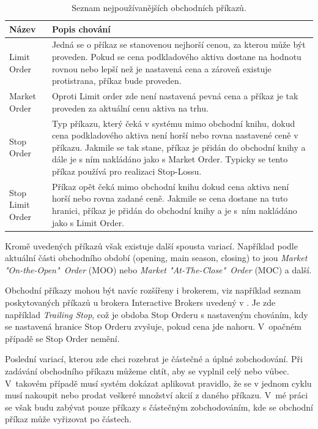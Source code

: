 \documentclass[thesis=M,czech]{FITthesis}[2012/06/26]
\begin{document}
\begin{table}[h]
 	\label{tab:orders}
	\begin{center}
		\def\arraystretch{1.5}%
		\begin{tabular}{|l|p{10cm}|}
		\hline
	    \textbf{Název} & \textbf{Popis chování} \\
	    \hline
	    Limit Order & Jedná se o příkaz se stanovenou nejhorší cenou, za kterou může být proveden. Pokud se cena podkladového aktiva dostane na hodnotu rovnou nebo lepší než je nastavená cena a zároveň existuje protistrana, příkaz bude proveden.
		\\ \hline
		Market Order & Oproti Limit order zde není nastavená pevná cena a příkaz je tak proveden za aktuální cenu aktiva na trhu.
		\\ \hline
	    Stop Order & Typ příkazu, který čeká v systému mimo obchodní knihu, dokud cena podkladového aktiva není horší nebo rovna nastavené ceně v příkazu. Jakmile se tak stane, příkaz je přidán do obchodní knihy a dále je s ním nakládáno jako s Market Order. Typicky se tento příkaz používá pro realizaci Stop-Lossu.
	    \\ \hline
	    Stop Limit Order & Příkaz opět čeká mimo obchodní knihu dokud cena aktiva není horší nebo rovna zadané ceně. Jakmile se cena dostane na tuto hranici, příkaz je přidán do obchodní knihy a je s~ním nakládáno jako s Limit Order.\\
	    \hline
	    \end{tabular}
	    \caption{Seznam nejpoužívanějších obchodních příkazů.}
	\end{center}
\end{table}

	Kromě uvedených příkazů však existuje další spousta variací. Například podle aktuální části obchodního období (opening, main season, closing) to jsou \textit{Market "On-the-Open"~Order} (MOO) nebo \textit{Market "At-The-Close"~Order} (MOC) a další.
	
	Obchodní příkazy mohou být navíc rozšířeny i brokerem, viz například seznam poskytovaných příkazů u brokera Interactive Brokers uvedený v \cite{IBOrders}. Je zde například \textit{Trailing Stop}, což je obdoba Stop Orderu s nastaveným chováním, kdy se nastavená hranice Stop Orderu zvyšuje, pokud cena jde nahoru. V~opačném případě se Stop Order nemění.
	 
	Poslední variací, kterou zde chci rozebrat je částečné a úplné zobchodování. Při zadávání obchodního příkazu můžeme chtít, aby se vyplnil celý nebo vůbec. V~takovém případě musí systém dokázat aplikovat pravidlo, že se v jednom cyklu musí nakoupit nebo prodat veškeré množství akcií z daného příkazu. V~mé práci se však budu zabývat pouze příkazy s částečným zobchodováním, kde se obchodní příkaz může vyřizovat po částech.
	
\end{document}
